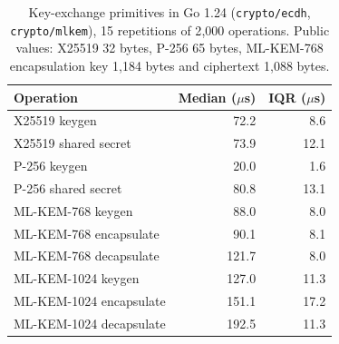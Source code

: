 \begin{table}[t]
\centering
\caption{Key-exchange primitives in Go 1.24 (\texttt{crypto/ecdh}, \texttt{crypto/mlkem}), 15 repetitions of 2{,}000 operations. Public values: X25519 32 bytes, P-256 65 bytes, ML-KEM-768 encapsulation key 1,184 bytes and ciphertext 1,088 bytes.}
\label{tab:prims}
\small
\begin{tabular}{lrr}
\toprule
Operation & Median ($\mu$s) & IQR ($\mu$s) \\
\midrule
X25519 keygen & 72.2 & 8.6 \\
X25519 shared secret & 73.9 & 12.1 \\
P-256 keygen & 20.0 & 1.6 \\
P-256 shared secret & 80.8 & 13.1 \\
ML-KEM-768 keygen & 88.0 & 8.0 \\
ML-KEM-768 encapsulate & 90.1 & 8.1 \\
ML-KEM-768 decapsulate & 121.7 & 8.0 \\
ML-KEM-1024 keygen & 127.0 & 11.3 \\
ML-KEM-1024 encapsulate & 151.1 & 17.2 \\
ML-KEM-1024 decapsulate & 192.5 & 11.3 \\
\bottomrule
\end{tabular}
\end{table}
